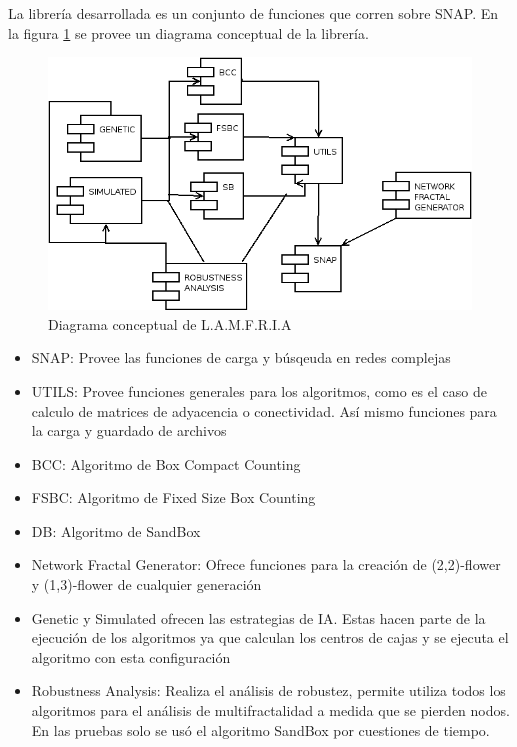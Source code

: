 La librería desarrollada es un conjunto de funciones que corren sobre SNAP. En la figura \ref{fig:diagramaConceptual} se provee un diagrama conceptual de la librería.

\begin{figure}[H]
    \centering
    \includegraphics[scale=0.7]{Capitulo7Libreria/imagenes/componentes.png}
    \caption{Diagrama conceptual de L.A.M.F.R.I.A}
    \label{fig:diagramaConceptual}
\end{figure}

\begin{itemize}
    \item SNAP: Provee las funciones de carga y búsqeuda en redes complejas
    \item UTILS: Provee funciones generales para los algoritmos, como es el caso de calculo de matrices de adyacencia o conectividad. Así mismo funciones para la carga y guardado de archivos
    \item BCC: Algoritmo de Box Compact Counting
    \item FSBC: Algoritmo de Fixed Size Box Counting
    \item DB: Algoritmo de SandBox
    \item Network Fractal Generator: Ofrece funciones para la creación de (2,2)-flower y (1,3)-flower de cualquier generación
    \item Genetic y Simulated ofrecen las estrategias de IA. Estas hacen parte de la ejecución de los algoritmos ya que calculan los centros de cajas y se ejecuta el algoritmo con esta configuración
    \item Robustness Analysis: Realiza el análisis de robustez, permite utiliza todos los algoritmos para el análisis de multifractalidad a medida que se pierden nodos. En las pruebas solo se usó el algoritmo SandBox por cuestiones de tiempo.
\end{itemize}